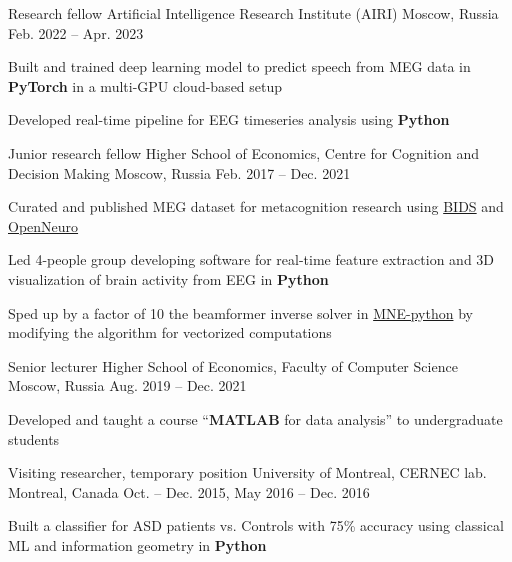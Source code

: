 
\begin{cventries}
  \cventry
    {Research fellow}
    {Artificial Intelligence Research Institute (AIRI)}
    {Moscow, Russia}
    {Feb. 2022 -- Apr. 2023}
    {
      \begin{cvitems}
      \item Built and trained deep learning model to predict speech from MEG data in \textbf{PyTorch} in a multi-GPU cloud-based setup
      \item Developed real-time pipeline for EEG timeseries analysis using \textbf{Python}
      \end{cvitems}
    }
  \cventry
    {Junior research fellow}
    {Higher School of Economics, Centre for Cognition and Decision Making}
    {Moscow, Russia}
    {Feb. 2017 -- Dec. 2021}
    {
      \begin{cvitems}
      \item{Curated and published MEG dataset for metacognition research using \href{https://bids.neuroimaging.io/}{BIDS} and \href{https://openneuro.org/}{OpenNeuro}}
      \item{Led 4-people group developing software for real-time feature extraction and 3D visualization of brain activity from EEG in \textbf{Python}}
        \item{Sped up by a factor of 10 the beamformer inverse solver in \href{https://github.com/mne-tools/mne-python}{MNE-python} by modifying the algorithm for vectorized computations}
      \end{cvitems}
    }
  \cventry
    {Senior lecturer}
    {Higher School of Economics, Faculty of Computer Science}
    {Moscow, Russia}
    {Aug. 2019 -- Dec. 2021}
    {
      \begin{cvitems}
      \item Developed and taught a course ``\textbf{MATLAB} for data analysis'' to undergraduate students
      \end{cvitems}
    }
  \cventry
    {Visiting researcher, temporary position}
    {University of Montreal, CERNEC lab.}
    {Montreal, Canada}
    {Oct. -- Dec. 2015, May 2016 -- Dec. 2016}
    {
      \begin{cvitems}
      \item{Built a classifier for ASD patients vs. Controls with 75\% accuracy using classical ML and information geometry in \textbf{Python}}

\end{cvitems}}
\end{cventries}

